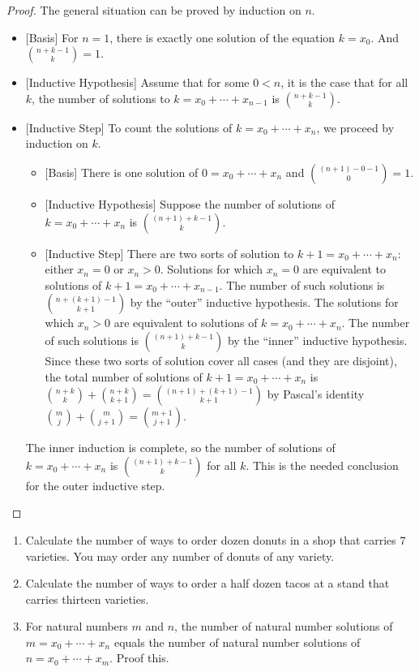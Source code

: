 \begin{lemma}
\begin{proof}
						The general situation can be proved by induction on $n$.
						\begin{itemize}
							\item{}[Basis] For $n=1$, there is exactly one solution of the equation $k = x_0$. And $\binom{n+k-1}{k} = 1$.
							\item{}[Inductive Hypothesis] Assume that for some $0<n$, it is the case that for all $k$, the number of solutions to $k = x_0 + \dotsb + x_{n-1}$ is $\binom{n+k-1}{k}$.
							\item{}[Inductive Step] To count the solutions of $k = x_0 + \dotsb + x_{n}$, we proceed by induction on $k$. 
							\begin{itemize}
								\item{}[Basis] There is one solution of $0=x_0 + \dotsb + x_n$
								and $\binom{(n+1)-0-1}{0} =  1$. 
								\item{}[Inductive Hypothesis] Suppose the number of solutions of
								$k = x_0 + \dotsb + x_n$ is $\binom{(n+1)+k-1}{k}$.
								\item{}[Inductive Step] There are two sorts of solution to $k+1 = x_0 + \dotsb + x_n$: either $x_n = 0$ or $x_n>0$. Solutions for which $x_n=0$ are equivalent to solutions of $k+1 = x_0 + \dotsb + x_{n-1}$. The number of such solutions is $\binom{n+(k+1)-1}{k+1}$ by the ``outer'' inductive hypothesis.
								The solutions for which $x_n > 0$ are equivalent to solutions of $k=x_0+\dotsb + x_n$. 
								The number of such solutions is $\binom{(n+1)+k-1}{k}$ by the ``inner'' inductive hypothesis. 
								Since these two sorts of solution cover all cases (and they are disjoint), 
								the total number of solutions of $k+1=x_0 + \dotsb + x_n$ is $\binom{n+k}{k} + \binom{n+k}{k+1} = \binom{(n+1)+(k+1)-1}{k+1}$ by Pascal's identity $\binom{m}{j} + \binom{m}{j+1} = \binom{m+1}{j+1}$.
							\end{itemize}
							The inner induction is complete, so the number of solutions of $k=x_0 + \dotsb + x_n$ is $\binom{(n+1)+k-1}{k}$ for all $k$. This is the needed conclusion for the outer inductive step.
						\end{itemize}
					\end{proof} 
				\end{lemma}
				
				\begin{exercises}
					\begin{enumerate}
						\item Calculate the number of ways to order dozen donuts in a shop that carries $7$ varieties.
						You may order any number of donuts of any variety.
						\item Calculate the number of ways to order a half dozen tacos at a stand that carries thirteen varieties.
						\item For natural numbers $m$ and $n$, the number of natural number solutions of $m=x_0+\dotsb+x_n$ equals the number of natural number solutions of $n=x_0 +\dotsb+x_m$. 
						Proof this.
					\end{enumerate}
				\end{exercises}
				
